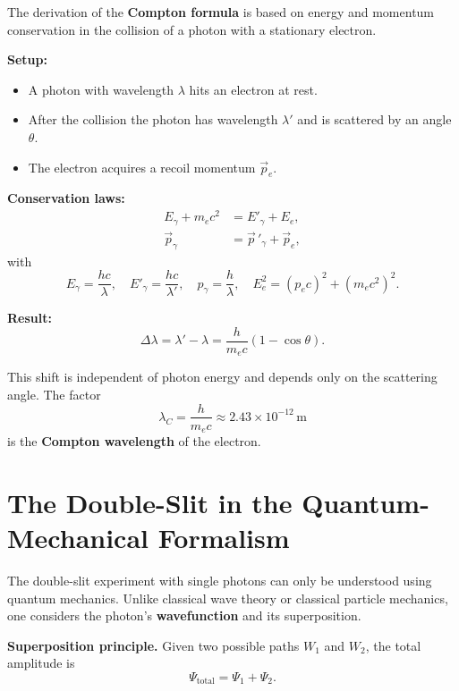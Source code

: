 The derivation of the \textbf{Compton formula} is based on energy and momentum conservation in the collision of a photon with a stationary electron. 

\textbf{Setup:}
\begin{itemize}
	\item A photon with wavelength \( \lambda \) hits an electron at rest.
	\item After the collision the photon has wavelength \( \lambda' \) and is scattered by an angle \( \theta \).
	\item The electron acquires a recoil momentum \( \vec{p}_e \).
\end{itemize}

\textbf{Conservation laws:}
\begin{align*}
	E_\gamma + m_e c^2 &= E'_\gamma + E_e ,\\
	\vec{p}_\gamma &= \vec{p}\,'_\gamma + \vec{p}_e ,
\end{align*}
with
\[
E_\gamma = \frac{hc}{\lambda}, \quad 
E'_\gamma = \frac{hc}{\lambda'}, \quad 
p_\gamma = \frac{h}{\lambda}, \quad 
E_e^2 = (p_e c)^2 + (m_e c^2)^2.
\]

\textbf{Result:}
\[
\Delta \lambda = \lambda' - \lambda 
= \frac{h}{m_e c}(1 - \cos \theta).
\]

This shift is independent of photon energy and depends only on the scattering angle. The factor
\[
\lambda_C = \frac{h}{m_e c} \approx 2.43 \times 10^{-12}\,\mathrm{m}
\]
is the \textbf{Compton wavelength} of the electron.

\section{The Double-Slit in the \newline Quantum-Mechanical Formalism}
\label{anhangA:doppelspalt}

The double-slit experiment with single photons can only be understood using quantum mechanics. 
Unlike classical wave theory or classical particle mechanics, one considers the photon’s \textbf{wavefunction} and its superposition.

\textbf{Superposition principle.}  
Given two possible paths \( W_1 \) and \( W_2 \), the total amplitude is
\[
\Psi_{\text{total}} = \Psi_{1} + \Psi_{2}.
\]


